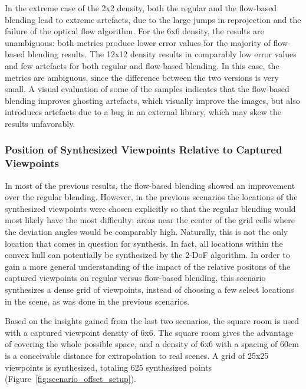 In the extreme case of the 2x2 density, both the regular and the flow-based blending lead to extreme artefacts, due to the large jumps in reprojection and the failure of the optical flow algorithm.
For the 6x6 density, the results are unambiguous: both metrics produce lower error values for the majority of flow-based blending results.
The 12x12 density results in comparably low error values and few artefacts for both regular and flow-based blending. In this case, the metrics are ambiguous, since the difference between the two versions is very small. A visual evaluation of some of the samples indicates that the flow-based blending improves ghosting artefacts, which visually improve the images, but also introduces artefacts due to a bug in an external library, which may skew the results unfavorably.















\subsubsection{Position of Synthesized Viewpoints Relative to Captured Viewpoints}
In most of the previous results, the flow-based blending showed an improvement over the regular blending. However, in the previous scenarios the locations of the synthesized viewpoints were chosen explicitly so that the regular blending would most likely have the most difficulty: areas near the center of the grid cells where the deviation angles would be comparably high. Naturally, this is not the only location that comes in question for synthesis. In fact, all locations within the convex hull can potentially be synthesized by the 2-DoF algorithm. In order to gain a more general understanding of the impact of the relative positons of the captured viewpoints on regular versus flow-based blending, this scenario synthesizes a dense grid of viewpoints, instead of choosing a few select locations in the scene, as was done in the previous scenarios.

Based on the insights gained from the last two scenarios, the square room is used with a captured viewpoint density of 6x6. The square room gives the advantage of covering the whole possible space, and a density of 6x6 with a spacing of 60cm is a conceivable distance for extrapolation to real scenes. A grid of 25x25 viewpoints is synthesized, totaling 625 synthesized points (Figure~\ref{fig:scenario_offset_setup}).

